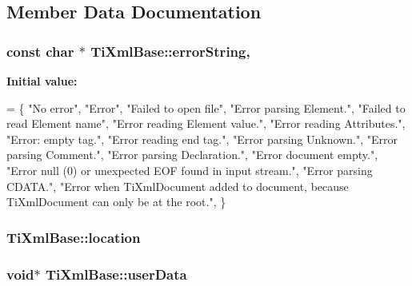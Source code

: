 \subsection{Member Data Documentation}
\hypertarget{class_ti_xml_base_a7ac8feec4100e446b3d78e1ac0659700}{
\subsubsection[{error\-String}]{\setlength{\rightskip}{0pt plus 5cm}const char $\ast$ Ti\-Xml\-Base\-::error\-String\hspace{0.3cm}{\ttfamily [static]}, {\ttfamily [protected]}}}\label{class_ti_xml_base_a7ac8feec4100e446b3d78e1ac0659700}
{\bfseries Initial value\-:}
\begin{DoxyCode}
=
\{
    \textcolor{stringliteral}{"No error"},
    \textcolor{stringliteral}{"Error"},
    \textcolor{stringliteral}{"Failed to open file"},
    \textcolor{stringliteral}{"Error parsing Element."},
    \textcolor{stringliteral}{"Failed to read Element name"},
    \textcolor{stringliteral}{"Error reading Element value."},
    \textcolor{stringliteral}{"Error reading Attributes."},
    \textcolor{stringliteral}{"Error: empty tag."},
    \textcolor{stringliteral}{"Error reading end tag."},
    \textcolor{stringliteral}{"Error parsing Unknown."},
    \textcolor{stringliteral}{"Error parsing Comment."},
    \textcolor{stringliteral}{"Error parsing Declaration."},
    \textcolor{stringliteral}{"Error document empty."},
    \textcolor{stringliteral}{"Error null (0) or unexpected EOF found in input stream."},
    \textcolor{stringliteral}{"Error parsing CDATA."},
    \textcolor{stringliteral}{"Error when TiXmlDocument added to document, because TiXmlDocument can only be at the root."},
\}
\end{DoxyCode}
\hypertarget{class_ti_xml_base_a0d992580f3bc264909f898e942677a3c}{
\subsubsection[{location}]{ Ti\-Xml\-Base\-::location\hspace{0.3cm}{\ttfamily [protected]}}}\label{class_ti_xml_base_a0d992580f3bc264909f898e942677a3c}
\hypertarget{class_ti_xml_base_ab242c01590191f644569fa89a080d97c}{
\subsubsection[{user\-Data}]{\setlength{\rightskip}{0pt plus 5cm}void$\ast$ Ti\-Xml\-Base\-::user\-Data\hspace{0.3cm}{\ttfamily [protected]}}}\label{class_ti_xml_base_ab242c01590191f644569fa89a080d97c}


